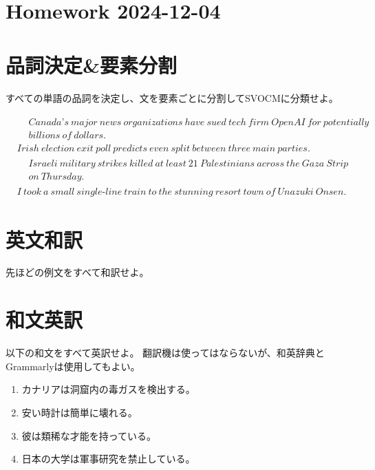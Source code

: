\documentclass[12pt,a4paper,titlepage]{jsarticle}
\title{}
\author{}
\date{\today}
\begin{document}
\setlength\lineskiplimit{30pt}
\setlength\lineskip{30pt}

\section*{Homework 2024-12-04}

\section{品詞決定\&要素分割}

すべての単語の品詞を決定し、文を要素ごとに分割してSVOCMに分類せよ。

\begin{align}
  &\begin{aligned}
    &Canada \text{'} s ~ major ~ news ~ organizations ~ have ~ sued ~ tech ~ firm ~ OpenAI ~ for ~ potentially ~ \\
    &billions ~ of ~ dollars \text{.}
  \end{aligned}\\
  &Irish ~ election ~ exit ~ poll ~ predicts ~ even ~ split ~ between ~ three ~ main ~ parties \text{.}\\
  &\begin{aligned}
    &Israeli ~ military ~ strikes ~ killed ~ at ~ least ~ 21 ~ Palestinians ~ across ~ the ~ Gaza ~ Strip ~ \\
    &on ~ Thursday \text{.}
  \end{aligned}\\
  &I ~ took ~ a ~ small ~ single \text{-} line ~ train ~ to ~ the ~ stunning ~ resort ~ town ~ of ~ Unazuki ~ Onsen \text{.}
\end{align}

\section{英文和訳}

先ほどの例文をすべて和訳せよ。

\section{和文英訳}

以下の和文をすべて英訳せよ。
翻訳機は使ってはならないが、和英辞典とGrammarlyは使用してもよい。

\begin{enumerate}
  \item カナリアは洞窟内の毒ガスを検出する。\\
  \item 安い時計は簡単に壊れる。\\
  \item 彼は類稀な才能を持っている。\\
  \item 日本の大学は軍事研究を禁止している。\\
\end{enumerate}
\end{document}
